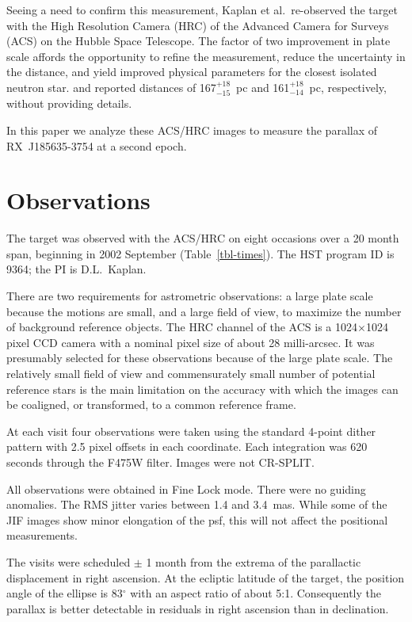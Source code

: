 \documentclass[12pt,preprint]{aastex}
\newcommand{\ud}[2]{\mbox{$^{+ #1}_{- #2}$}}
\begin{document}
Seeing a need to confirm this measurement, Kaplan et al.\
re-observed the target with the High Resolution Camera (HRC)
of the Advanced Camera for Surveys (ACS) on the Hubble Space Telescope.
The factor of two improvement in plate scale affords the opportunity to
refine the measurement, reduce the uncertainty in the distance, and yield
improved physical parameters for the closest isolated neutron star.
\citet{KvKA07} and \citet{vKK07} reported distances of 167\ud{18}{15}~pc
and 161\ud{18}{14}~pc, respectively, without providing
details.

In this paper we analyze these ACS/HRC images to measure the parallax of
RX~J185635-3754 at a second epoch.


\section{Observations}

The target was observed with the ACS/HRC on eight
occasions over a 20 month span,
beginning in 2002 September (Table~\ref{tbl-times}). 
The HST program ID is 9364; the PI is D.L.~Kaplan. 

There are two requirements for astrometric observations: a large plate scale
because the motions are small, and a large field of view, to maximize the
number of background reference objects.
The HRC channel of the ACS is a 1024$\times$1024 pixel CCD camera with a
nominal pixel size of about 28 milli-arcsec. It was presumably
selected for these observations because of the large plate scale. 
The relatively small field of view and commensurately small number of
potential reference stars is the main limitation on the accuracy
with which the images
can be coaligned, or transformed, to a common reference frame.

At each visit four
observations were taken using the standard 4-point dither pattern with 2.5 pixel
offsets in each coordinate. Each integration was 620 seconds through the 
F475W filter. Images were not CR-SPLIT.

All observations were obtained in Fine Lock
mode. There were no guiding anomalies. The RMS jitter varies between 1.4 and 
3.4~mas. While some of the JIF images show minor elongation of the psf, this
will not affect the positional measurements.

The visits were scheduled $\pm$ 1 month from the extrema of the parallactic 
displacement in right ascension.
At the ecliptic latitude of the target, the position angle of the ellipse
is 83$^\circ$ with an aspect ratio of about 5:1. Consequently the parallax 
is better detectable in residuals in right ascension than in declination.
\end{document}
